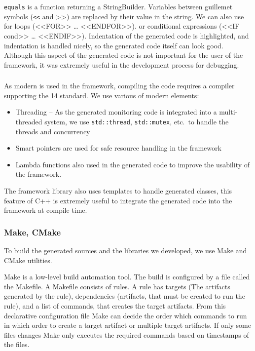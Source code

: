 \texttt{equals} is a function returning a StringBuilder.
Variables between guillemet symbols (\texttt{<<} and >>) are replaced by their value in the string. 
We can also use for loops (<<FOR>> \dots{} <<ENDFOR>>). or conditional expressions (<<IF cond>> \dots{} <<ENDIF>>).
Indentation of the generated code is highlighted, and indentation is handled nicely, so the generated code itself can look good. 
Although this aspect of the generated code is not important for the user of the framework, it was extremely useful in the development process for debugging. 

\subsubsection{\protect\cpptt }

As modern \cpp{} is used in the framework, compiling the code requires a compiler supporting the \cpp{}14 standard.
We use various of modern \cpp{} elements:
\begin{itemize}
	\item Threading -- As the generated monitoring code is integrated into a multi-threaded system, we use \texttt{std::thread}, \texttt{std::mutex}, etc.\ to handle the threads and concurrency
	\item Smart pointers are used for safe resource handling in the framework
	\item Lambda functions also used in the generated code to improve the usability of the framework.
\end{itemize}
The framework library also uses \cpp{} templates to handle generated classes, this feature of C++ is extremely useful to integrate the generated code into the framework at compile time. 

\subsubsection{ Make, CMake }

To build the generated sources and the \cpp{} libraries we developed, we use Make and CMake utilities. 

Make is a low-level build automation tool. 
The build is configured by a file called the Makefile.
A Makefile consists of rules. 
A rule has targets (The artifacts generated by the rule), dependencies (artifacts, that must be created to run the rule), and a list of commands, that creates the target artifacts. 
From this declarative configuration file Make can decide the order which commands to run in which order to create a target artifact or multiple target artifacts.
If only some files changes Make only executes the required commands based on timestamps of the files.

